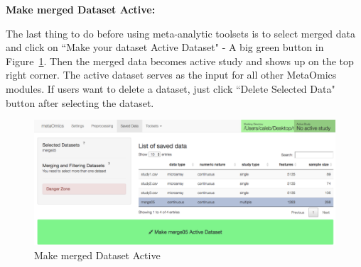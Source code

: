 \begin{steps}
\item \textbf{Make merged Dataset Active:}

\label{sec:active}
The last thing to do before using meta-analytic toolsets is to select merged data and click on 
``Make your dataset Active Dataset" - A big green button in Figure~\ref{fig:active}.
Then the merged data becomes active study and shows up on the top right corner.
The active dataset serves as the input for all other MetaOmics modules.
If users want to delete a dataset, just click ``Delete Selected Data" button after selecting the dataset.

\begin{figure}[H]
\begin{center}
\includegraphics[scale=0.4]{./figure/preprocessing/GUImarkActive}
\caption{Make merged Dataset Active}
\label{fig:active}
\end{center}
\end{figure}



\end{steps}

